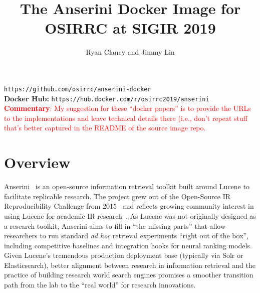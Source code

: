 \documentclass[sigconf]{acmart}
\newcommand{\red}[1]{\textcolor{red}{#1}}
\newcommand{\commentary}[1]{\noindent \red{{\bf Commentary}: #1}}
\begin{document}
\title{The Anserini Docker Image for OSIRRC at SIGIR 2019}

\author{Ryan Clancy and Jimmy Lin}



\maketitle


 \texttt{\small https://github.com/osirrc/anserini-docker} \\
{\bf Docker Hub:} \texttt{\small https://hub.docker.com/r/osirrc2019/anserini} \\

\commentary{My suggestion for these ``docker papers'' is to provide the URLs to the implementations and leave technical details there (i.e., don't repeat stuff that's better captured in the README of the source image repo.}

\section{Overview}

Anserini~\cite{Yang_etal_SIGIR2017,Yang_etal_JDIQ2018} is an open-source information retrieval toolkit built around Lucene to facilitate replicable research.
The project grew out of the Open-Source IR Reproducibility Challenge from 2015~\cite{Lin_etal_ECIR2016} and reflects growing community interest in using Lucene for academic IR research~\cite{azzopardi2016lucene4ir,Azzopardi_etal_SIGIR2017}.
As Lucene was not originally designed as a research toolkit, Anserini aims to fill in ``the missing parts'' that allow researchers to run standard {\it ad hoc} retrieval experiments ``right out of the box'', including competitive baselines and integration hooks for neural ranking models.
Given Lucene's tremendous production deployment base (typically via Solr or Elasticsearch), better alignment between research in information retrieval and the practice of building research world search engines promises a smoother transition path from the lab to the ``real world'' for research innovations.
\end{document}
